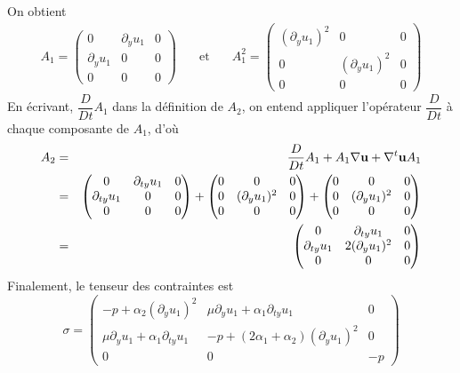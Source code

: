 On obtient 
\begin{eqnarray*}
    A_1 = \begin{pmatrix}
        0 & \partial_yu_1 & 0 \\
        \partial_yu_1 & 0 & 0 \\
        0 & 0 & 0
    \end{pmatrix} \ \ \ &\text{ et }& \ \ \ A_1^2 = \begin{pmatrix}
        (\partial_yu_1)^2 & 0 & 0 \\
        0 & (\partial_y u_1)^2 & 0 \\
        0 & 0 & 0
    \end{pmatrix}
\end{eqnarray*}
En écrivant, $\dfrac{D}{Dt}A_1$ dans la définition de $A_2$, on entend appliquer l'opérateur $\dfrac{D}{Dt}$ à chaque composante de $A_1$, d'où
\begin{eqnarray*}
    A_2 &=& \dfrac{D}{Dt}A_1 + A_1\nabla \bm{\mathrm{u}} + \nabla^t\bm{\mathrm{u}} A_1 \\
    &=& \begin{pmatrix}
        0 & \partial_{ty} u_1 & 0 \\
        \partial_{ty}u_1 & 0 & 0 \\
        0 & 0 & 0
    \end{pmatrix} + \begin{pmatrix}
        0 & 0 & 0 \\
        0 & (\partial_yu_1)^2 & 0 \\
        0 & 0 & 0
    \end{pmatrix} + \begin{pmatrix}
        0 & 0 & 0 \\
        0 & (\partial_yu_1)^2 & 0 \\
        0 & 0 & 0
    \end{pmatrix} \\
    &=& \begin{pmatrix}
        0 & \partial_{ty}u_1 & 0 \\
        \partial_{ty} u_1 & 2(\partial_yu_1)^2 & 0 \\
        0 & 0 & 0
    \end{pmatrix}
\end{eqnarray*}
Finalement, le tenseur des contraintes est
\begin{equation*}
    \sigma = \begin{pmatrix}
        -p+\alpha_2(\partial_yu_1)^2 & \mu\partial_yu_1 + \alpha_1 \partial_{ty}u_1 & 0 \\
        \mu \partial_yu_1+\alpha_1\partial_{ty} u_1 & -p+(2\alpha_1+\alpha_2)(\partial_yu_1)^2 & 0 \\
        0 & 0 & -p
    \end{pmatrix}
\end{equation*}
